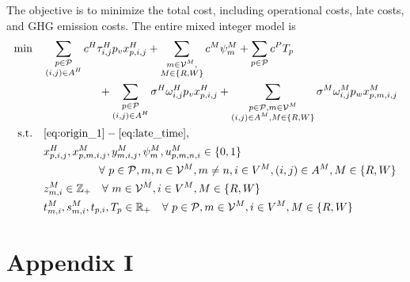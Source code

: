 \documentclass[12pt]{article}
\numberwithin{equation}{section}
\begin{document}
	The objective is to minimize the total cost, including operational costs, late costs, and GHG emission costs. The entire mixed integer model is
	\begin{align}
	\min\quad &\sum_{\substack{p\in \mathcal{P}\\ (i, j)\in A^H}}c^H\tau^H_{i, j}p_v x^H_{p, i, j}+\sum_{\substack{m\in \mathcal{V}^M, \\M\in\{R, W\}}}c^M\psi^M_{m}+\sum_{p\in \mathcal{P}}c^P T_p\notag\\
	&\text{\hspace{50pt}}+\sum_{\substack{p\in \mathcal{P}\\ (i, j)\in A^H}}\sigma^H\omega^H_{i, j}p_vx^H_{p, i, j}+\sum_{\substack{p\in \mathcal{P}, m\in \mathcal{V}^M\\ (i, j)\in A^M,M\in\{R, W\}}}\sigma^M\omega^M_{i, j}p_wx^M_{p, m, i, j}\label{eq:obj}\\
	\text{s.t.}\quad & \eqref{eq:origin_1}-\eqref{eq:late_time},\notag\\
	&x^H_{p, i, j}, x^M_{p, m, i, j}, y^M_{m, i, j}, \psi^M_{m}, u^M_{p, m, n, i}\in\{0, 1\}\notag\\
	&\text{\hspace{50pt}}\forall\ p\in\mathcal{P},m, n\in\mathcal{V}^M,m\ne n, i\in V^M, (i,j)\in A^M, M\in\{R, W\}\\
	&z^M_{m, i}\in\mathbb{Z}_+\quad \forall\ m\in\mathcal{V}^M,i\in V^M,M\in\{R, W\}\\
	&t^M_{m, i}, s^M_{m, i}, t_{p, i}, T_{p}\in\mathbb{R}_+\quad \forall\ p\in\mathcal{P},m\in\mathcal{V}^M,i\in V^M,M\in\{R, W\}\label{eq:bound}
	\end{align}


\newpage

\nocite{*}
\printbibliography

\newpage
\appendix

\section*{Appendix I}
	
\end{document}
